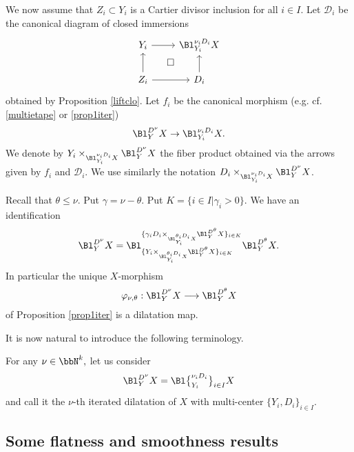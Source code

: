 \documentclass[10pt]{alggeom}
\renewcommand{\leq}{\leqslant}
\theoremstyle{definition}
\numberwithin{equation}{section}
\begin{document}
We now assume that $Z_i \subset Y_i$ is a Cartier divisor inclusion for all $i \in I$.
 Let $\mathcal{D}_i $ be the canonical diagram of closed immersions \[\begin{tikzcd} Y_i \ar[r] \arrow[rd, "\square",phantom] &  \Bl _{Y_i}^{\nu_i D_i } X   \\ Z_i \ar[u] \ar[r] & \ar[u] D_i \end{tikzcd} \] obtained by Proposition \ref{liftclo}.
Let $f_i$ be the canonical morphism (e.g. cf.  \ref{multietape} or \ref{prop1iter})
\[ \Bl _{Y}^{D^{\nu}} X \to \Bl _{Y_i}^{{\nu_i}D_i } X  .\] 
 We denote by $Y_i \times _{\Bl _{Y_i}^{{\nu_i}D_i } X}\Bl _{Y}^{D^{\nu}}X$ the fiber product obtained via the arrows given by $f_i$ and $\mathcal{D}_i$. We use similarly the notation $D_i \times _{\Bl _{Y_i}^{{\nu_i}D_i } X}\Bl _{Y}^{D^{\nu}}X$.



 \label{nutheta} Recall that $\theta \leq \nu $. Put $\gamma = \nu - \theta$. Put $K = \{ i \in I | \gamma _i >0 \}.$ We have an identification
 \[\Bl _{Y}^{D^{\nu}} X = \Bl ^{\{{{\gamma _i}D_i \times _{\Bl _{Y_i}^{\theta _i D_i } X}\Bl _{Y}^{D^{\theta}} X\}_{i \in K}}} _{\{Y_i   \times _{\Bl _{Y_i}^{\theta _i D_i } X}\Bl _{Y}^{D^{\theta}} X \}_{i \in K}} \Bl _{Y}^{D^{\theta}} X .\]
  In particular the unique $X$-morphism 
\[ \varphi _{\nu , \theta}: \Bl _{Y}^{D^{\nu}} X \longrightarrow \Bl _{Y}^{D^{\theta}} X   \] of Proposition \ref{prop1iter} is a dilatation map.
\xprop

It is now natural to introduce the following terminology.

 For any $\nu \in \bbN ^k, $ let us consider
\[ \Bl _{Y}^{D^{\nu}} X= \Bl \big\{_{Y_i}^{\nu _i D_i}\big\}_{i \in I} X\] and call it the $\nu$-th iterated dilatation of $X$ with multi-center $\{Y_i,D_i\}_{i\in I}$.
\xdefi 




\subsection{Some flatness and smoothness results}
\label{sec6}
\end{document}
